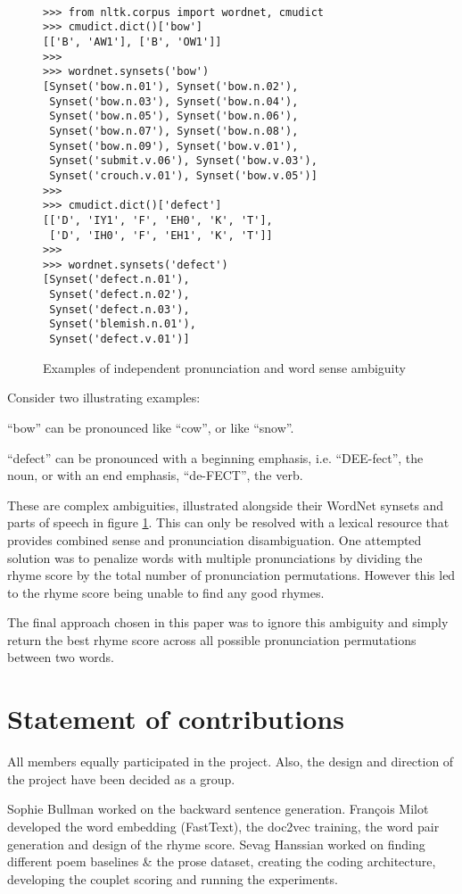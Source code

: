 \documentclass[11pt,a4paper]{article}
\newenvironment{tight_enumerate}{
\begin{enumerate}
\setlength{\itemsep}{0pt}
\setlength{\parskip}{0pt}
}{\end{enumerate}}
\begin{document}
\begin{figure}
\begin{Verbatim}[fontsize=\small]

>>> from nltk.corpus import wordnet, cmudict
>>> cmudict.dict()['bow']
[['B', 'AW1'], ['B', 'OW1']]
>>>
>>> wordnet.synsets('bow')
[Synset('bow.n.01'), Synset('bow.n.02'),
 Synset('bow.n.03'), Synset('bow.n.04'),
 Synset('bow.n.05'), Synset('bow.n.06'),
 Synset('bow.n.07'), Synset('bow.n.08'),
 Synset('bow.n.09'), Synset('bow.v.01'),
 Synset('submit.v.06'), Synset('bow.v.03'),
 Synset('crouch.v.01'), Synset('bow.v.05')]
>>>
>>> cmudict.dict()['defect']
[['D', 'IY1', 'F', 'EH0', 'K', 'T'],
 ['D', 'IH0', 'F', 'EH1', 'K', 'T']]
>>>
>>> wordnet.synsets('defect')
[Synset('defect.n.01'),
 Synset('defect.n.02'),
 Synset('defect.n.03'),
 Synset('blemish.n.01'),
 Synset('defect.v.01')]
\end{Verbatim}
\caption{Examples of independent pronunciation and word sense ambiguity}
\label{fig:wordnet}
\end{figure}

Consider two illustrating examples:
\begin{tight_enumerate}
	\vspace{-0.5em}
	\item
		``bow'' can be pronounced like ``cow'', or like ``snow''.
	\item
		``defect'' can be pronounced with a beginning emphasis, i.e. ``DEE-fect'', the noun, or with an end emphasis, ``de-FECT'', the verb.
\end{tight_enumerate}

These are complex ambiguities, illustrated alongside their WordNet synsets and parts of speech in figure \ref{fig:wordnet}. This can only be resolved with a lexical resource that provides combined sense and pronunciation disambiguation. One attempted solution was to penalize words with multiple pronunciations by dividing the rhyme score by the total number of pronunciation permutations. However this led to the rhyme score being unable to find any good rhymes.

The final approach chosen in this paper was to ignore this ambiguity and simply return the best rhyme score across all possible pronunciation permutations between two words.

\section{Statement of contributions}
\label{sec:contributions}
All members equally participated in the project. Also, the design and direction of the project have been decided as a group. 

Sophie Bullman worked on the backward sentence generation. François Milot developed the word embedding (FastText), the doc2vec training, the word pair generation and design of the rhyme score. Sevag Hanssian worked on finding different poem baselines \& the prose dataset, creating the coding architecture, developing the couplet scoring and running the experiments.



\end{document}
